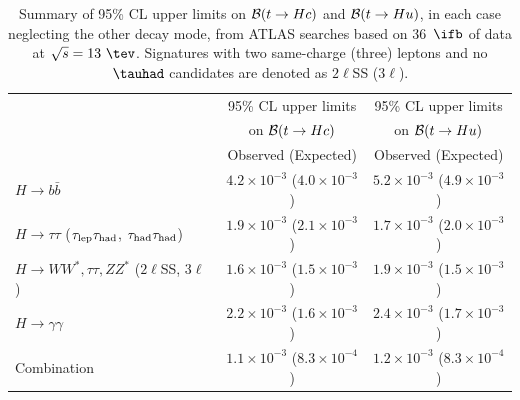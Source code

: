\begin{table}[t!]
\begin{center}
\begin{tabular}{lcc}
\toprule\toprule
 & \multicolumn{1}{c}{95\% CL upper limits} & \multicolumn{1}{c}{95\% CL upper limits}  \\
 & \multicolumn{1}{c}{on $\mathcal{B}(t \to Hc)$} & \multicolumn{1}{c}{on $\mathcal{B}(t \to Hu)$} \\
 &  Observed (Expected) & Observed (Expected)  \\
\midrule\midrule
$H \to b\bar{b}$ & $4.2 \times 10^{-3}$ ($4.0 \times 10^{-3}$) & $5.2 \times 10^{-3}$ ($4.9 \times 10^{-3}$) \\
$H \to \tau\tau$ ($\tau_{\mathrm{lep}} \tau_{\mathrm{had}}$, $\tau_{\mathrm{had}} \tau_{\mathrm{had}}$) & $1.9 \times 10^{-3}$ ($2.1 \times 10^{-3}$) & $1.7 \times 10^{-3}$ ($2.0 \times 10^{-3}$) \\ 
$H \to WW^*, \tau\tau, ZZ^*$ ($2\ell$SS, $3\ell$)~\cite{Aaboud:2018pob}  & $1.6 \times 10^{-3}$ ($1.5 \times 10^{-3}$) & $1.9 \times 10^{-3}$ ($1.5 \times 10^{-3}$) \\ 
$H \to \gamma\gamma$~\cite{Aaboud:2017mfd} & $2.2 \times 10^{-3}$ ($1.6 \times 10^{-3}$) & $2.4 \times 10^{-3}$ ($1.7 \times 10^{-3}$) \\
\midrule
Combination  & $1.1 \times 10^{-3}$ ($8.3 \times 10^{-4}$) & $1.2 \times 10^{-3}$ ($8.3 \times 10^{-4}$) \\
\bottomrule\bottomrule
\end{tabular}
\caption{\small{Summary of 95\% CL upper limits on $\mathcal{B}(t \to Hc)$ and $\mathcal{B}(t \to Hu)$, in each case neglecting the other decay mode, from ATLAS searches based on 
36~$\ifb$ of data at $\sqrt{s}=13~\tev$. Signatures with two same-charge (three) leptons and no $\tauhad$ candidates
are denoted as $2\ell$SS ($3\ell$). }}
\label{tab:limits_summary}
\end{center}
\end{table}

